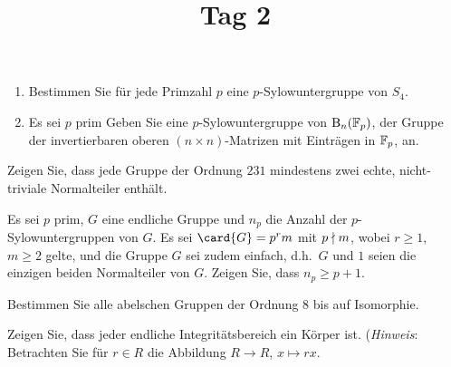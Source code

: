 \documentclass[a4paper, 10pt]{scrartcl}
\title{Tag 2}
\author{}
\date{}
\begin{document}
\begin{question}
  \begin{enumerate}
    \item
      Bestimmen Sie für jede Primzahl $p$ eine $p$-Sylowuntergruppe von $S_4$.
    \item
      Es sei $p$ prim
      Geben Sie eine $p$-Sylowuntergruppe von $\operatorname{B}_{n}(\mathbb{F}_p)$, der Gruppe der invertierbaren oberen $(n \times n)$-Matrizen mit Einträgen in $\mathbb{F}_p$, an.
  \end{enumerate}
\end{question}

\begin{question}
  Zeigen Sie, dass jede Gruppe der Ordnung $231$ mindestens zwei echte, nicht-triviale Normalteiler enthält.
\end{question}

\begin{question}
  Es sei $p$ prim, $G$ eine endliche Gruppe und $n_p$ die Anzahl der $p$-Sylowuntergruppen von $G$.
  Es sei $\card{G} = p^r m$ mit $p \mathrel{\nmid} m$, wobei $r \geq 1$, $m \geq 2$ gelte, und die Gruppe $G$ sei zudem einfach, d.h.\ $G$ und $1$ seien die einzigen beiden Normalteiler von $G$.
  Zeigen Sie, dass $n_p \geq p + 1$.
\end{question}


\begin{question}
  Bestimmen Sie alle abelschen Gruppen der Ordnung $8$ bis auf Isomorphie.
\end{question}

\begin{question}
  Zeigen Sie, dass jeder endliche Integritätsbereich ein Körper ist.
  \newline
  (\emph{Hinweis}:
  Betrachten Sie für $r \in R$ die Abbildung $R \to R$, $x \mapsto rx$.
\end{question}
\end{document}
